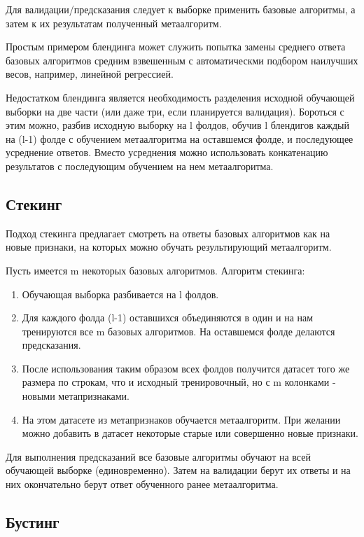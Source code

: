 Для валидации/предсказания следует к выборке применить базовые алгоритмы, а затем к их результатам полученный метаалгоритм.

Простым примером блендинга может служить попытка замены среднего ответа базовых алгоритмов средним взвешенным с автоматическми подбором наилучших весов, например, линейной регрессией.

Недостатком блендинга является необходимость разделения исходной обучающей выборки на две части (или даже три, если планируется валидация). Бороться с этим можно, разбив исходную выборку на l фолдов, обучив l блендигов каждый на (l-1) фолде с обучением метаалгоритма на оставшемся фолде, и последующее усреднение ответов. Вместо усреднения можно использовать конкатенацию результатов с последующим обучением на нем метаалгоритма.

\subsection{Стекинг}

Подход стекинга предлагает смотреть на ответы базовых алгоритмов как на новые признаки, на которых можно обучать результирующий метаалгоритм.

Пусть имеется m некоторых базовых алгоритмов. Алгоритм стекинга:
\begin{enumerate}
    \item Обучающая выборка разбивается на l фолдов.
    \item Для каждого фолда (l-1) оставшихся объединяются в один и на нам тренируются все m базовых алгоритмов. На оставшемся фолде делаются предсказания.
    \item После использования таким образом всех фолдов получится датасет того же размера по строкам, что и исходный тренировочный, но с m колонками - новыми метапризнаками.
    \item На этом датасете из метапризнаков обучается метаалгоритм. При желании можно добавить в датасет некоторые старые или совершенно новые признаки.
\end{enumerate}

Для выполнения предсказаний все базовые алгоритмы обучают на всей обучающей выборке (единовременно). Затем на валидации берут их ответы и на них окончательно берут ответ обученного ранее метаалгоритма.  


\subsection{Бустинг}

